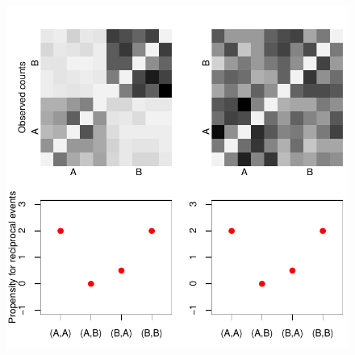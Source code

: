 

\begin{figure}
\centering
\includegraphics[scale=.8]{../figs/introexample/all}
\caption{}
\label{fig:example}
\end{figure}

